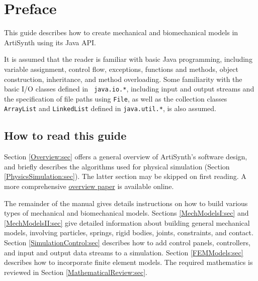 
\def\maindoc{}%
\def\doctitle{ArtiSynth Modeling Guide}

\def\pdfbreak{\iflatexml\else\\\fi}




\chapter*{Preface}

This guide describes how to create mechanical and biomechanical models
in ArtiSynth using its Java API. 

It is assumed that the reader is familiar with basic Java programming,
including variable assignment, control flow, exceptions, functions and
methods, object construction, inheritance, and method overloading.
Some familiarity with the basic I/O classes defined in {\tt
java.io.*}, including input and output streams and the specification
of file paths using {\tt File}, as well as the collection classes
{\tt ArrayList} and {\tt LinkedList} defined in {\tt java.util.*}, is
also assumed.

\section*{How to read this guide}

Section \ref{Overview:sec} offers a general overview of ArtiSynth's
software design, and briefly describes the algorithms used for
physical simulation (Section \ref{PhysicsSimulation:sec}). The latter
section may be skipped on first reading. A more comprehensive
\href{http://www.artisynth.org/doc/artisynth.pdf}{overview paper} is
available online.

The remainder of the manual gives details instructions on how to build
various types of mechanical and biomechanical models.  Sections
\ref{MechModelsI:sec} and \ref{MechModelsII:sec} give detailed
information about building general mechanical models, involving
particles, springs, rigid bodies, joints, constraints, and
contact. Section \ref{SimulationControl:sec} describes how to add
control panels, controllers, and input and output data streams to a
simulation.  Section \ref{FEMModels:sec} describes how to incorporate
finite element models. The required mathematics is reviewed in Section
\ref{MathematicalReview:sec}.

